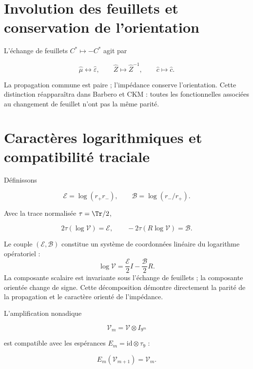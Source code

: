 \section{Involution des feuillets et conservation de l'orientation}

L'échange de feuillets \(C^*\mapsto-C^*\) agit par

\begin{equation}
\widehat\mu\longleftrightarrow\widehat\varepsilon,\qquad
\widehat Z\longmapsto\widehat Z^{-1},
\qquad
\widehat c\longmapsto\widehat c.
\label{eq:vacuum-sheet}
\end{equation}

La propagation commune est paire ; l'impédance conserve l'orientation.
Cette distinction réapparaîtra dans Barbero et CKM : toutes les fonctionnelles
associées au changement de feuillet n'ont pas la même parité.

\section{Caractères logarithmiques et compatibilité traciale}

Définissons

\[
\mathcal E=\log(r_+r_-),\qquad
\mathcal B=\log(r_-/r_+).
\]

Avec la trace normalisée \(\tau=\Tr/2\),

\begin{equation}
2\tau(\log\mathcal V)=\mathcal E,
\qquad
-2\tau(R\log\mathcal V)=\mathcal B.
\label{eq:vacuum-traces}
\end{equation}

Le couple \((\mathcal E,\mathcal B)\) constitue un système de coordonnées linéaire du logarithme
opératoriel :
\begin{equation}
\log\mathcal V
=\frac{\mathcal E}{2}I-\frac{\mathcal B}{2}R.
\label{eq:vacuum-log-decomposition}
\end{equation}
La composante scalaire est invariante sous l'échange de feuillets ; la
composante orientée change de signe. Cette décomposition démontre
directement la parité de la propagation et le caractère orienté de
l'impédance.

L'amplification nonadique

\[
\mathcal V_m=\mathcal V\otimes I_{9^m}
\]

est compatible avec les espérances \(E_m=\mathrm{id}\otimes\tau_9\) :

\[
E_m(\mathcal V_{m+1})=\mathcal V_m.
\]


